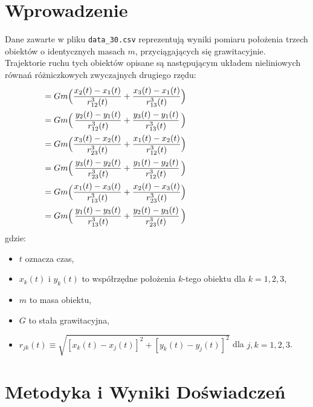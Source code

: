 \documentclass[a4paper, 12pt, twoside, openany]{article}
\begin{document}
	\section{Wprowadzenie}
	Dane zawarte w pliku \texttt{data\_30.csv} reprezentują wyniki pomiaru położenia trzech obiektów o
	identycznych masach $m$, przyciągających się grawitacyjnie. Trajektorie ruchu tych obiektów opisane
	są następującym układem nieliniowych równań różniczkowych zwyczajnych drugiego rzędu:
	\[\hspace{-5cm}
	\left\{
	\begin{alignedat}{4}
		\dfrac{d^2x_1(t)}{dt^2} & = Gm \Big( & \dfrac{x_2(t) - x_1(t)}{r^3_{12}(t)} & + \dfrac{x_3(t) - x_1(t)}{r^3_{13}(t)} & \Big) \\
		\dfrac{d^2y_1(t)}{dt^2} & = Gm \Big( & \dfrac{y_2(t) - y_1(t)}{r^3_{12}(t)} & + \dfrac{y_3(t) - y_1(t)}{r^3_{13}(t)} & \Big) \\
		\dfrac{d^2x_2(t)}{dt^2} & = Gm \Big( & \dfrac{x_3(t) - x_2(t)}{r^3_{23}(t)} & + \dfrac{x_1(t) - x_2(t)}{r^3_{12}(t)} & \Big) \\
		\dfrac{d^2y_2(t)}{dt^2} & = Gm \Big( & \dfrac{y_3(t) - y_2(t)}{r^3_{23}(t)} & + \dfrac{y_1(t) - y_2(t)}{r^3_{12}(t)} & \Big) \\
		\dfrac{d^2x_3(t)}{dt^2} & = Gm \Big( & \dfrac{x_1(t) - x_3(t)}{r^3_{13}(t)} & + \dfrac{x_2(t) - x_3(t)}{r^3_{23}(t)} & \Big) \\
		\dfrac{d^2y_3(t)}{dt^2} & = Gm \Big( & \dfrac{y_1(t) - y_3(t)}{r^3_{13}(t)} & + \dfrac{y_2(t) - y_3(t)}{r^3_{23}(t)} & \Big)
	\end{alignedat}
	\right.
	\]
	gdzie:
	\begin{itemize}[label=\footnotesize$\bullet$, topsep=0pt, parsep=0pt, leftmargin=10mm]
		\item $t$ oznacza czas,
		\item $x_k(t)$ i $y_k(t)$ to współrzędne położenia $k$-tego obiektu dla $k = 1,2,3$,
		\item $m$ to masa obiektu,
		\item $G$ to stała grawitacyjna,
		\item $r_{jk}(t) \equiv \sqrt{\left[x_k(t) - x_j(t)\right]^2 + \left[y_k(t) - y_j(t)\right]^2}$ dla $j,k = 1,2,3$.
	\end{itemize}
	
	
	\section{Metodyka i Wyniki Doświadczeń}
	
\end{document}
